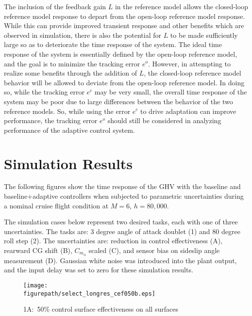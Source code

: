 \documentclass[]{../sty/aiaa-tc}
\newcommand{\figurepath}{../fig}
\begin{document}
  The inclusion of the feedback gain $L$ in the reference model allows the closed-loop reference model response to depart from the open-loop reference model response.
  While this can provide improved transient response\cite{gibson.ecc.2013,gibson.ieeetrans.2013,gibson.acc2.2013} and other benefits which are observed in simulation, there is also the potential for $L$ to be made sufficiently large so as to deteriorate the time response of the system.
  The ideal time response of the system is essentially defined by the open-loop reference model, and the goal is to minimize the tracking error $e^{o}$.
  However, in attempting to realize some benefits through the addition of $L$, the closed-loop reference model behavior will be allowed to deviate from the open-loop reference model.
  In doing so, while the tracking error $e^{c}$ may be very small, the overall time response of the system may be poor due to large differences between the behavior of the two reference models.
  So, while using the error $e^{c}$ to drive adaptation can improve performance, the tracking error $e^{o}$ should still be considered in analyzing performance of the adaptive control system.

  \section{Simulation Results}

  The following figures show the time response of the GHV with the baseline and baseline+adaptive controllers when subjected to parametric uncertainties during a nominal cruise flight condition at $M=6$, $h=80,000$.

  The simulation cases below represent two desired tasks, each with one of three uncertainties.
  The tasks are: $3$ degree angle of attack doublet (1) and $80$ degree roll step (2).
  The uncertainties are: reduction in control effectiveness (A), rearward CG shift (B), $C_{m_{\alpha}}$ scaled (C), and sensor bias on sideslip angle measurement (D).
  Gaussian white noise was introduced into the plant output, and the input delay was set to zero for these simulation results.

  \begin{figure}[H]
    \begin{center}
      \texttt{[image: \\figurepath/select\_longres\_cef050b.eps]}
      \caption{1A:\ 50\% control surface effectiveness on all surfaces}
    \end{center}
  \end{figure}
\end{document}
